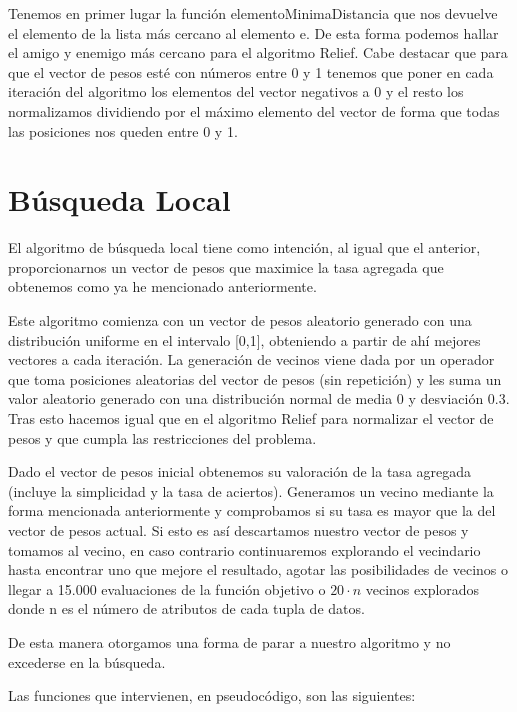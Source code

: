 \documentclass[12pt,a4paper]{article}
\begin{document}
	Tenemos en primer lugar la función elementoMinimaDistancia que nos devuelve el elemento de la lista más cercano al elemento e. De esta forma podemos hallar el amigo y enemigo más cercano para el algoritmo Relief. Cabe destacar que para que el vector de pesos esté con números entre 0 y 1 tenemos que poner en cada iteración del algoritmo los elementos del vector negativos a 0 y el resto los normalizamos dividiendo por el máximo elemento del vector de forma que todas las posiciones nos queden entre 0 y 1.
	
	\newpage

	\section{Búsqueda Local}
	\label{sec:bl}

	El algoritmo de búsqueda local tiene como intención, al igual que el anterior, proporcionarnos un vector de pesos que maximice la tasa agregada que obtenemos como ya he mencionado anteriormente.
	
	Este algoritmo comienza con un vector de pesos aleatorio generado con una distribución uniforme en el intervalo [0,1], obteniendo a partir de ahí mejores vectores a cada iteración. La generación de vecinos viene dada por un operador que toma posiciones aleatorias del vector de pesos (sin repetición) y les suma un valor aleatorio generado con una distribución normal de media 0 y desviación 0.3. Tras esto hacemos igual que en el algoritmo Relief para normalizar el vector de pesos y que cumpla las restricciones del problema.
	
	Dado el vector de pesos inicial obtenemos su valoración de la tasa agregada (incluye la simplicidad y la tasa de aciertos). Generamos un vecino mediante la forma mencionada anteriormente y comprobamos si su tasa es mayor que la del vector de pesos actual. Si esto es así descartamos nuestro vector de pesos y tomamos al vecino, en caso contrario continuaremos explorando el vecindario hasta encontrar uno que mejore el resultado, agotar las posibilidades de vecinos o llegar a 15.000 evaluaciones de la función objetivo o $20\cdot n$ vecinos explorados donde n es el número de atributos de cada tupla de datos.
	
	De esta manera otorgamos una forma de parar a nuestro algoritmo y no excederse en la búsqueda.
	
	Las funciones que intervienen, en pseudocódigo, son las siguientes:
	
\end{document}
